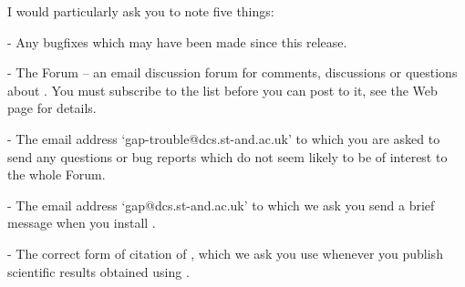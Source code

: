I would particularly ask you to note five things:
\beginlist
\item{-} Any bugfixes which may have been made since this release.
\item{-} The  {\GAP} Forum -- an email discussion forum for comments,
discussions or questions about {\GAP}. You must subscribe to the list
before you can post to it, see the Web page for details.
\item{-} The email address `gap-trouble@dcs.st-and.ac.uk' to which you are asked to send
any questions or bug reports which do not seem likely to be of interest
to the whole {\GAP} Forum.
\item{-} The email address `gap@dcs.st-and.ac.uk' to which we ask you send a brief message 
when you install {\GAP}.
\item{-} The correct form of citation of {\GAP}, which we ask you use
whenever you publish scientific results obtained using {\GAP}.
\endlist

